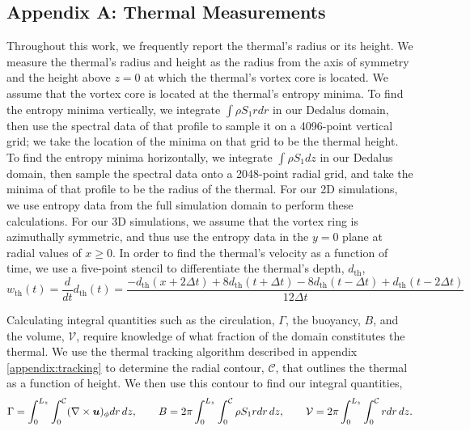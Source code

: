 \subsection{Appendix A: Thermal Measurements}
\label{appendix:measurements}
Throughout this work, we frequently report the thermal's radius or its height.
We measure the thermal's radius and height as the radius from the axis of symmetry and the height above $z = 0$ at which the thermal's vortex core is located.
We assume that the vortex core is located at the thermal's entropy minima.
To find the entropy minima vertically, we integrate $\int\rho S_1 r dr$ in our Dedalus domain, then use the spectral data of that profile to sample it on a 4096-point vertical grid; we take the location of the minima on that grid to be the thermal height.
To find the entropy minima horizontally, we integrate $\int \rho S_1 dz$ in our Dedalus domain, then sample the spectral data onto a 2048-point radial grid, and take the minima of that profile to be the radius of the thermal.
For our 2D simulations, we use entropy data from the full simulation domain to perform these calculations.
For our 3D simulations, we assume that the vortex ring is azimuthally symmetric, and thus use the entropy data in the $y = 0$ plane at radial values of $x \geq 0$.
In order to find the thermal's velocity as a function of time, we use a five-point stencil to differentiate the thermal's depth, $d_{\text{th}}$,
$$
w_{\text{th}}(t) = \frac{d }{dt}d_{\text{th}}(t) = \frac{-d_{\text{th}}(x + 2\Delta t) + 8d_{\text{th}}(t + \Delta t) - 8 d_{\text{th}}(t - \Delta t) + d_{\text{th}}(t - 2\Delta t)}{12\Delta t}
$$

Calculating integral quantities such as the circulation, $\Gamma$, the buoyancy, $B$, and the volume, $\mathcal{V}$, require knowledge of what fraction of the domain constitutes the thermal.
We use the thermal tracking algorithm described in appendix \ref{appendix:tracking} to determine the radial contour, $\mathcal{C}$, that outlines the thermal as a function of height.
We then use this contour to find our integral quantities,
\begin{equation}
\Gamma = \int_0^{L_z}\int_0^{\mathcal{C}} (\nabla\times\bm{u})_\phi dr\,dz, \qquad
B      = 2\pi \int_0^{L_z}\int_0^{\mathcal{C}} \rho S_1 r dr\,dz, \qquad
\mathcal{V} = 2\pi \int_0^{L_z}\int_0^{\mathcal{C}}r dr\,dz.
\end{equation}


